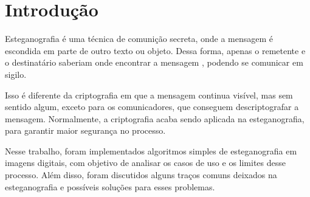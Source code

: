 \section{Introdução}

Esteganografia é uma técnica de comunição secreta, onde a mensagem é escondida em parte de outro texto ou objeto. Dessa forma, apenas o remetente e o destinatário saberiam onde encontrar a mensagem , podendo se comunicar em sigilo.

Isso é diferente da criptografia em que a mensagem continua visível, mas sem sentido algum, exceto para os comunicadores, que conseguem descriptografar a mensagem. Normalmente, a criptografia acaba sendo aplicada na esteganografia, para garantir maior segurança no processo.

Nesse trabalho, foram implementados algoritmos simples de esteganografia em imagens digitais, com objetivo de analisar os casos de uso e os limites desse processo. Além disso, foram discutidos alguns traços comuns deixados na esteganografia e possíveis soluções para esses problemas.
